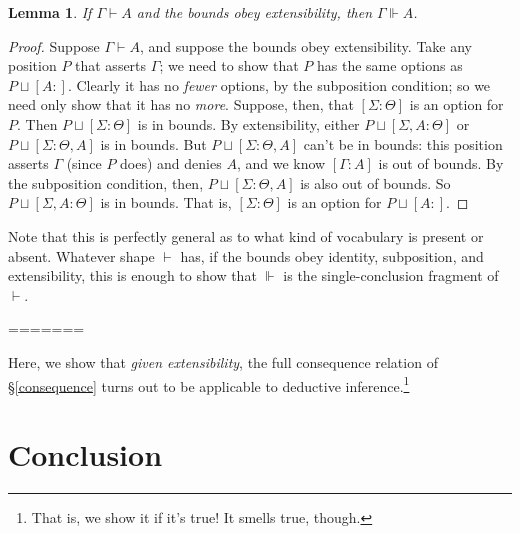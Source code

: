 \documentclass{article}
\newcommand{\G}{\ensuremath{\Gamma}}
\newcommand{\Sig}{\ensuremath{\Sigma}}
\newcommand{\pcup}{\ensuremath{\sqcup}}
\newcommand{\pos}[2]{\ensuremath{[#1:#2]}}
\newcommand{\cns}{\vdash}
\newcommand{\ded}{\Vdash}
\newtheorem{lem}{Lemma}
\begin{document}
\begin{lem}
If $\G \cns A$ and the bounds obey extensibility, then $\G \ded A$.
\end{lem}

\begin{proof}
Suppose $\G \cns A$, and suppose the bounds obey extensibility.
Take any position $P$ that asserts $\G$; we need to show that $P$ has the same options as $P \pcup \pos{A}{}$.
Clearly it has no {\em fewer} options, by the subposition condition; so we need only show that it has no {\em more}.
Suppose, then, that $\pos{\Sig}{\Theta}$ is an option for $P$.
Then $P \pcup \pos{\Sig}{\Theta}$ is in bounds.
By extensibility, either $P \pcup \pos{\Sig, A}{\Theta}$ or $P \pcup \pos{\Sig}{\Theta, A}$ is in bounds.
But $P \pcup \pos{\Sig}{\Theta, A}$ can't be in bounds: this position asserts $\G$ (since $P$ does) and denies $A$, and we know $\pos{\G}{A}$ is out of bounds.
By the subposition condition, then, $P \pcup \pos{\Sig}{\Theta, A}$ is also out of bounds.
So $P \pcup \pos{\Sig, A}{\Theta}$ is in bounds.
That is, $\pos{\Sig}{\Theta}$ is an option for $P \pcup \pos{A}{}$.
\end{proof}

Note that this is perfectly general as to what kind of vocabulary is present or absent.
Whatever shape $\cns$ has, if the bounds obey identity, subposition, and extensibility, this is enough to show that $\ded$ is the single-conclusion fragment of $\cns$.

=======

Here, we show that {\em given extensibility}, the full consequence relation of \S\ref{consequence} turns out to be applicable to deductive inference.\footnote{That is, we show it if it's true! It smells true, though.}



\section{Conclusion}
\end{document}
